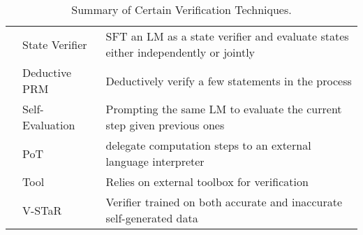 \begin{table*}[!htbp]
{\begin{tabular}{lll}
        \rowcolor{gray!10}
        & State Verifier~\citep{yao2023tree} & SFT an LM as a state verifier and evaluate states either independently or jointly \\
        \rowcolor{gray!10}
        & Deductive PRM~\citep{ling2023deductive} & Deductively verify a few statements in the process \\ 
        \rowcolor{gray!10}
        & Self-Evaluation~\citep{xie2023selfevaluation} & Prompting the same LM to evaluate the current step given previous ones \\
        \rowcolor{gray!10}
        & PoT~\citep{chen2023program} & delegate computation steps to an external language interpreter \\
        \rowcolor{gray!10}
        & Tool~\citep{li2025startselftaughtreasonertools} & Relies on external toolbox for verification \\
        \rowcolor{gray!10}\multirow{-7}{*}{\textbf{Process}}
        & V-STaR~\citep{hosseini2024vstartrainingverifiersselftaught} & Verifier trained on both accurate and inaccurate self-generated data \\
    \bottomrule
    \end{tabular}}
    \caption{Summary of Certain Verification Techniques.}
    \label{tab:verification}
\end{table*}


